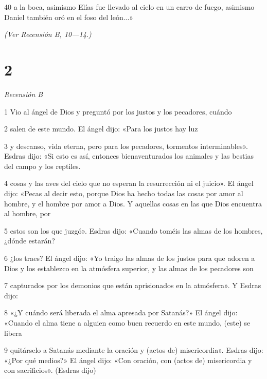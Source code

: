 \par 40 a la boca, asimismo Elías fue llevado al cielo en un carro de fuego, asimismo Daniel también oró en el foso del león...»

\par \textit{(Ver Recensión B, 10—14.)}

\chapter{2}

\par \textit{Recensión B}

\par 1 Vio al ángel de Dios y preguntó por los justos y los pecadores, cuándo

\par 2 salen de este mundo. El ángel dijo: «Para los justos hay luz

\par 3 y descanso, vida eterna, pero para los pecadores, tormentos interminables». Esdras dijo: «Si esto es así, entonces bienaventurados los animales y las bestias del campo y los reptiles.

\par 4 cosas y las aves del cielo que no esperan la resurrección ni el juicio». El ángel dijo: «Pecas al decir esto, porque Dios ha hecho todas las cosas por amor al hombre, y el hombre por amor a Dios. Y aquellas cosas en las que Dios encuentra al hombre, por

\par 5 estos son los que juzgó». Esdras dijo: «Cuando toméis las almas de los hombres, ¿dónde estarán?

\par 6 ¿los traes? El ángel dijo: «Yo traigo las almas de los justos para que adoren a Dios y los establezco en la atmósfera superior, y las almas de los pecadores son

\par 7 capturados por los demonios que están aprisionados en la atmósfera». Y Esdras dijo:

\par 8 «¿Y cuándo será liberada el alma apresada por Satanás?» El ángel dijo: «Cuando el alma tiene a alguien como buen recuerdo en este mundo, (este) se libera

\par 9 quitárselo a Satanás mediante la oración y (actos de) misericordia». Esdras dijo: «¿Por qué medios?» El ángel dijo: «Con oración, con (actos de) misericordia y con sacrificios». (Esdras dijo)

